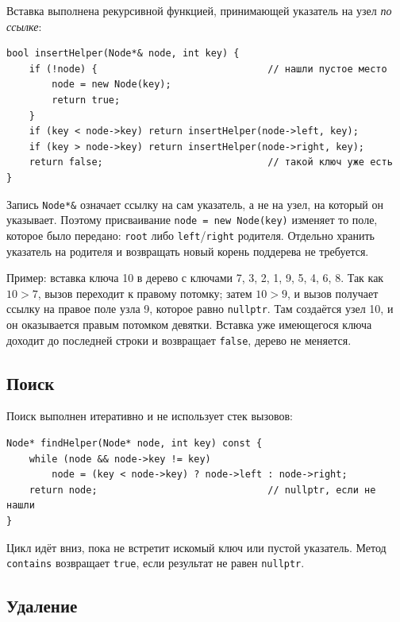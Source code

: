 \documentclass[otchet]{SCWorks}
\begin{document}
Вставка выполнена рекурсивной функцией, принимающей указатель на узел
\emph{по ссылке}:

\begin{verbatim}
bool insertHelper(Node*& node, int key) {
    if (!node) {                              // нашли пустое место
        node = new Node(key);
        return true;
    }
    if (key < node->key) return insertHelper(node->left, key);
    if (key > node->key) return insertHelper(node->right, key);
    return false;                             // такой ключ уже есть
}
\end{verbatim}

Запись \texttt{Node*\&} означает ссылку на сам указатель, а не на узел,
на который он указывает. Поэтому присваивание \texttt{node = new Node(key)}
изменяет то поле, которое было передано: \texttt{root} либо
\texttt{left}/\texttt{right} родителя. Отдельно хранить указатель на
родителя и возвращать новый корень поддерева не требуется.

Пример: вставка ключа 10 в дерево с ключами 7, 3, 2, 1, 9, 5, 4, 6, 8.
Так как $10 > 7$, вызов переходит к правому потомку; затем $10 > 9$, и
вызов получает ссылку на правое поле узла 9, которое равно
\texttt{nullptr}. Там создаётся узел 10, и он оказывается правым потомком
девятки. Вставка уже имеющегося ключа доходит до последней строки и
возвращает \texttt{false}, дерево не меняется.

\subsection{Поиск}

Поиск выполнен итеративно и не использует стек вызовов:

\begin{verbatim}
Node* findHelper(Node* node, int key) const {
    while (node && node->key != key)
        node = (key < node->key) ? node->left : node->right;
    return node;                              // nullptr, если не нашли
}
\end{verbatim}

Цикл идёт вниз, пока не встретит искомый ключ или пустой указатель.
Метод \texttt{contains} возвращает \texttt{true}, если результат не равен
\texttt{nullptr}.

\subsection{Удаление}
\end{document}
